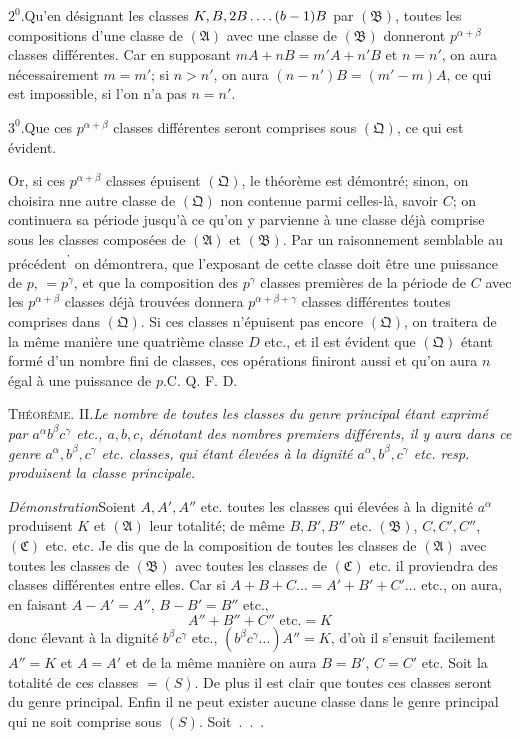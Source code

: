 $2^0$.\quad Qu’en désignant les classes $K,B,2B\mathinner{.\,.\,.\,.}(b-1)B$ par $(\mathfrak B)$, toutes les compositions d’une classe de $(\mathfrak A)$ avec une classe de $(\mathfrak B)$ donneront $p^{\alpha+\beta}$ classes différentes. Car en supposant $mA+nB=m'A+n'B$ et $n=n'$, on aura nécessairement $m=m'$; si $n>n'$, on aura $(n-n')B=(m'-m)A$, ce qui est impossible, si l’on n’a pas $n=n'$.

$3^0$.\quad Que ces $p^{\alpha+\beta}$ classes différentes seront comprises sous $(\mathfrak Q)$, ce qui est évident.

Or, si ces $p^{\alpha+\beta}$ classes épuisent $(\mathfrak Q)$, le théorème est démontré; sinon, on choisira nne autre classe de $(\mathfrak Q)$ non contenue parmi celles-là, savoir $C$; on continuera sa période jusqu’à ce qu’on y parvienne à une classe déjà comprise sous les classes composées de $(\mathfrak A)$ et $(\mathfrak B)$. Par un raisonnement semblable au précédent\textsuperscript{'} on démontrera, que l’exposant de cette classe doit être une puissance de $p$, $=p^\gamma$, et que la composition des $p^\gamma$ classes premières de la période de $C$ avec les $p^{\alpha+\beta}$ classes déjà trouvées donnera $p^{\alpha+\beta+\gamma}$ classes différentes toutes comprises dans $(\mathfrak Q)$. Si ces classes n’épuisent pas encore $(\mathfrak Q)$, on traitera de la même manière une quatrième classe $D$ etc., et il est évident que $(\mathfrak Q)$ étant formé d’un nombre fini de classes, ces opérations finiront aussi et qu’on aura $n$ égal à une puissance de $p$.\quad C. Q. F. D.

\par\bigskip
{}
\textsc{Théorème. II.}\quad\emph{Le nombre de toutes les classes du genre principal étant exprimé par $a^\alpha b^\beta c^\gamma$ etc., $a,b,c$, dénotant des nombres premiers différents, il y aura dans ce genre $a^\alpha,b^\beta,c^\gamma$ etc. classes, qui étant élevées à la dignité $a^\alpha,b^\beta,c^\gamma$ etc. resp. produisent la classe principale.}

\emph{Démonstration}\quad Soient $A,A',A''$ etc. toutes les classes qui élevées à la dignité $a^\alpha$ produisent $K$ et $(\mathfrak A)$ leur totalité; de même $B,B',B''$ etc. $(\mathfrak B)$, $C,C',C''$, $(\mathfrak C)$ etc. etc. Je dis que de la composition de toutes les classes de $(\mathfrak A)$ avec toutes les classes de $(\mathfrak B)$ avec toutes les classes de $(\mathfrak C)$ etc. il proviendra des classes différentes entre elles. Car si $A+B+C\dots=A'+B'+C'\dots$ etc., on aura, en faisant $A-A'=A''$, $B-B'=B''$ etc.,
\[
A''+B''+C''\text{ etc.}=K
\]
donc élevant à la dignité $b^\beta c^\gamma$ etc., $(b^\beta c^\gamma\dots)A''=K$, d’où il s’ensuit facilement
%
$A''=K$ et $A=A'$ et de la même manière on aura $B=B'$, $C=C'$ etc. Soit la totalité de ces classes $=(S)$. De plus il est clair que toutes ces classes seront du genre principal. Enfin il ne peut exister aucune classe dans le genre principal qui ne soit comprise sous $(S)$. Soit\ .\ .\ .

